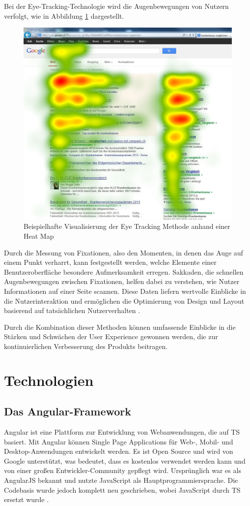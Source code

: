 Bei der Eye-Tracking-Technologie wird die Augenbewegungen von Nutzern verfolgt, wie in Abbildung \ref{eye_tracking} dargestellt. 

\begin{figure}[h]
    \centering
    \includegraphics[clip,width=0.4\linewidth]{images/Eye-Tracking-Google-Search-Heat-Map.jpg}
    \caption[Beispielhafte Visualisierung der Eye Tracking Methode anhand einer Heat Map]{Beispielhafte Visualisierung der Eye Tracking Methode anhand einer Heat Map \cite{image_eye_tracking}}
    \label{eye_tracking}
\end{figure}

Durch die Messung von Fixationen, also den Momenten, in denen das Auge auf einem Punkt verharrt, kann festgestellt werden, welche Elemente einer Benutzeroberfläche besondere Aufmerksamkeit erregen. 
Sakkaden, die schnellen Augenbewegungen zwischen Fixationen, helfen dabei zu verstehen, wie Nutzer Informationen auf einer Seite scannen. 
Diese Daten liefern wertvolle Einblicke in die Nutzerinteraktion und ermöglichen die Optimierung von Design und Layout basierend auf tatsächlichen Nutzerverhalten \cite[S.3 ff.]{eye_tracking}.
  
Durch die Kombination dieser Methoden können umfassende Einblicke in die Stärken und Schwächen der User Experience gewonnen werden, die zur kontinuierlichen Verbesserung des Produkts beitragen.

\section{Technologien}

\subsection{Das Angular-Framework}
Angular ist eine Plattform zur Entwicklung von Webanwendungen, die auf \ac{TS} basiert. 
Mit Angular können Single Page Applications für Web-, Mobil- und Desktop-Anwendungen entwickelt werden. 
Es ist Open Source und wird von Google unterstützt, was bedeutet, dass es kostenlos verwendet werden kann und von einer großen Entwickler-Community gepflegt wird. 
Ursprünglich war es als AngularJS bekannt und nutzte JavaScript als Hauptprogrammiersprache. Die Codebasis wurde jedoch komplett neu geschrieben, wobei JavaScript durch TS ersetzt wurde \cite{angular_arch}.

